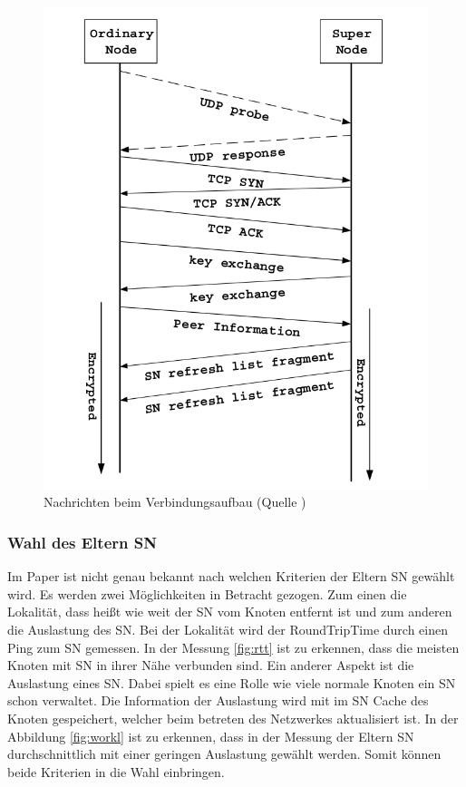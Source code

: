 \begin{figure}
\includegraphics[scale=0.3]{gfx/join}
\caption{Nachrichten beim Verbindungsaufbau (Quelle \cite{liang2006fasttrack})}
\label{fig:join}
\end{figure}

\subsubsection{Wahl des Eltern SN}
\label{subsubsec:wElternSN}

Im Paper \cite{liang2006fasttrack} ist nicht genau bekannt nach welchen Kriterien der Eltern SN gewählt wird. 
Es werden zwei Möglichkeiten in Betracht gezogen.
Zum einen die Lokalität, dass heißt wie weit der SN vom Knoten entfernt ist und zum anderen die Auslastung des SN.
Bei der Lokalität wird der RoundTripTime durch einen Ping zum SN gemessen.
In der Messung \ref{fig:rtt} ist zu erkennen, dass die meisten Knoten mit SN in ihrer Nähe verbunden sind.
Ein anderer Aspekt ist die Auslastung eines SN.
Dabei spielt es eine Rolle wie viele normale Knoten ein SN schon verwaltet.
Die Information der Auslastung wird mit im SN Cache des Knoten gespeichert, welcher beim betreten des Netzwerkes aktualisiert ist.
In der Abbildung \ref{fig:workl} ist zu erkennen, dass in der Messung der Eltern SN durchschnittlich mit einer geringen Auslastung gewählt werden.
Somit können beide Kriterien in die Wahl einbringen.

